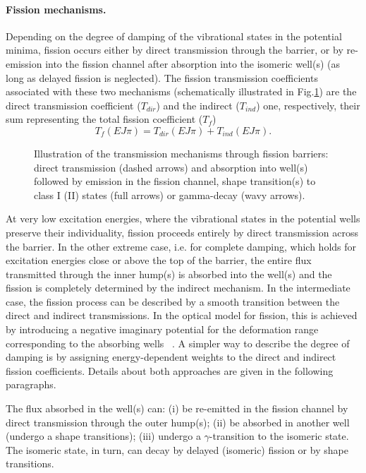 \paragraph*{Fission mechanisms.}

Depending on the degree of damping of the vibrational states in the
potential minima, fission occurs either by direct transmission through the
barrier, or by re-emission into the fission channel after absorption into
the isomeric well(s) (as long as delayed fission is neglected). The
fission transmission coefficients associated with these two mechanisms
(schematically illustrated in Fig.\ref{fis-mech}) are the direct
transmission coefficient ($T_{dir}$) and the indirect ($T_{ind}$) one,
respectively, their sum representing the total fission coefficient ($T_{f}$)
\begin{equation}
T_{f}(EJ\pi)=T_{dir}(EJ\pi)+T_{ind}(EJ\pi).  \label{tf}
\end{equation}
\begin{figure}[htbp]
\caption{Illustration of the transmission mechanisms through fission
barriers: direct transmission (dashed arrows) and absorption into well(s)
followed by emission in the fission channel, shape transition(s) to class I
(II) states (full arrows) or gamma-decay (wavy arrows).}
\label{fis-mech}
\end{figure}
At very low excitation energies, where the vibrational states in the
potential wells preserve their individuality, fission proceeds entirely by
direct transmission across the barrier. In the other extreme case, i.e. for
complete damping, which holds for excitation energies close or above the
top of the barrier, the entire flux transmitted through the inner hump(s) is
absorbed into the well(s) and the fission is completely determined by the
indirect mechanism. In the intermediate case, the fission process can be
described by a smooth transition between the direct and indirect
transmissions. In the optical model for fission, this is achieved by
introducing a negative imaginary potential for the deformation range
corresponding to the absorbing wells ~\cite{Bhandari:79, Back:74}. A simpler
way to describe the degree of damping is by assigning energy-dependent
weights to the direct and indirect fission coefficients. Details about both
approaches are given in the following paragraphs.

The flux absorbed in the well(s) can: \newline
\qquad (i) be re-emitted in the fission channel by direct transmission
through the outer hump(s); \newline
\qquad (ii) be absorbed in another well (undergo a shape transitions);
\newline
\qquad (iii) undergo a $\gamma $-transition to the isomeric state. The
isomeric state, in turn, can decay by delayed (isomeric) fission or by shape
transitions.


